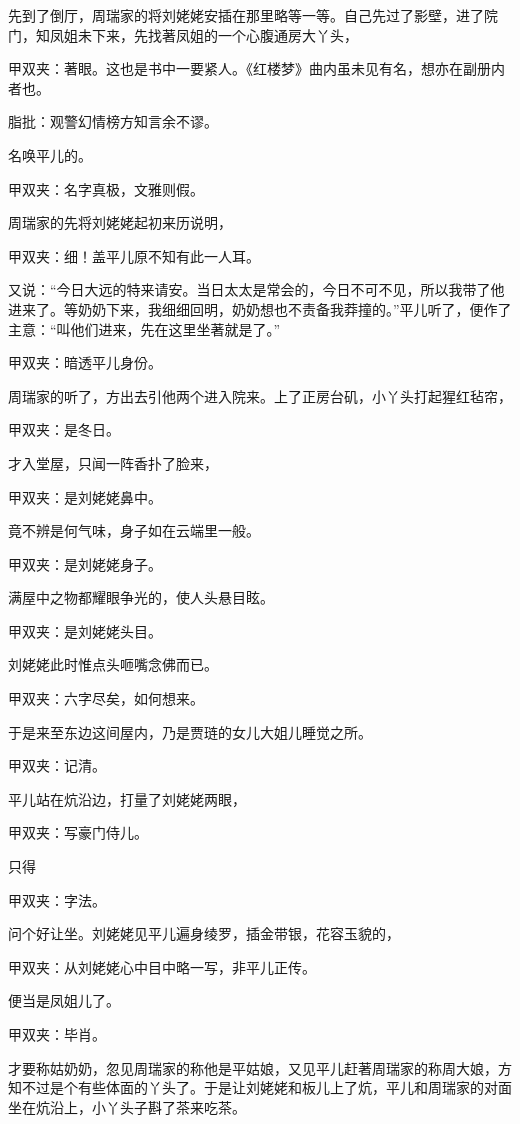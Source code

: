 \begin{parag}
    先到了倒厅，周瑞家的将刘姥姥安插在那里略等一等。自己先过了影壁，进了院门，知凤姐未下来，先找著凤姐的一个心腹通房大丫头，\begin{note}甲双夹：著眼。这也是书中一要紧人。《红楼梦》曲内虽未见有名，想亦在副册内者也。\end{note}\begin{note}脂批：观警幻情榜方知言余不谬。\end{note}名唤平儿的。\begin{note}甲双夹：名字真极，文雅则假。\end{note}周瑞家的先将刘姥姥起初来历说明，\begin{note}甲双夹：细！盖平儿原不知有此一人耳。\end{note}又说：“今日大远的特来请安。当日太太是常会的，今日不可不见，所以我带了他进来了。等奶奶下来，我细细回明，奶奶想也不责备我莽撞的。”平儿听了，便作了主意：“叫他们进来，先在这里坐著就是了。”\begin{note}甲双夹：暗透平儿身份。\end{note}周瑞家的听了，方出去引他两个进入院来。上了正房台矶，小丫头打起猩红毡帘，\begin{note}甲双夹：是冬日。\end{note}才入堂屋，只闻一阵香扑了脸来，\begin{note}甲双夹：是刘姥姥鼻中。 \end{note}竟不辨是何气味，身子如在云端里一般。\begin{note}甲双夹：是刘姥姥身子。 \end{note}满屋中之物都耀眼争光的，使人头悬目眩。\begin{note}甲双夹：是刘姥姥头目。\end{note}刘姥姥此时惟点头咂嘴念佛而已。\begin{note}甲双夹：六字尽矣，如何想来。\end{note}于是来至东边这间屋内，乃是贾琏的女儿大姐儿睡觉之所。\begin{note}甲双夹：记清。\end{note}平儿站在炕沿边，打量了刘姥姥两眼，\begin{note}甲双夹：写豪门侍儿。\end{note}只得\begin{note}甲双夹：字法。\end{note}问个好让坐。刘姥姥见平儿遍身绫罗，插金带银，花容玉貌的，\begin{note}甲双夹：从刘姥姥心中目中略一写，非平儿正传。 \end{note}便当是凤姐儿了。\begin{note}甲双夹：毕肖。\end{note}才要称姑奶奶，忽见周瑞家的称他是平姑娘，又见平儿赶著周瑞家的称周大娘，方知不过是个有些体面的丫头了。于是让刘姥姥和板儿上了炕，平儿和周瑞家的对面坐在炕沿上，小丫头子斟了茶来吃茶。
\end{parag}


